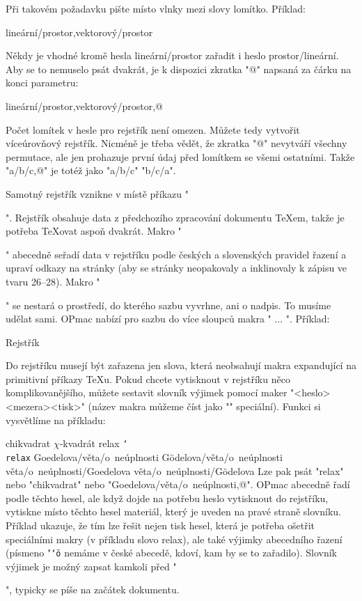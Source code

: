 \noindent Při takovém požadavku pište místo vlnky mezi slovy lomítko. Příklad:

\begtt
\ii lineární/prostor,vektorový/prostor
\endtt

Někdy je vhodné kromě hesla lineární/prostor zařadit i heslo
prostor/lineární. Aby se to nemuselo psát dvakrát, je k dispozici zkratka
"@" napsaná za čárku na konci parametru:

\begtt
\ii lineární/prostor,vektorový/prostor,@
\endtt

Počet lomítek v hesle pro rejstřík není omezen. Můžete tedy vytvořit
víceúrovňový rejstřík. Nicméně je třeba vědět, že zkratka "@" nevytváří
všechny permutace, ale jen prohazuje první údaj před lomítkem se všemi
ostatními. Takže "\ii a/b/c,@" je totéž jako "\ii a/b/c" "\ii b/c/a".

Samotný rejstřík vznikne v místě příkazu "\makeindex". Rejstřík obsahuje
data z předchozího zpracování dokumentu \TeX{}em, takže je potřeba
\TeX{}ovat aspoň dvakrát. Makro "\makeindex" abecedně seřadí data v rejstříku
podle českých a slovenských pravidel řazení a upraví odkazy na stránky
(aby se stránky neopakovaly a inklinovaly k zápisu ve tvaru 26--28). Makro
"\makeindex" se nestará o prostředí, do kterého sazbu vyvrhne, ani o nadpis.
To musíme udělat sami. OPmac nabízí pro sazbu do více sloupců makra
" ... \endmulti". Příklad:

\begtt
\sec Rejstřík\par
{} \makeindex \endmulti
\endtt

Do rejstříku musejí být zařazena jen  slova, která neobsahují makra
expandující na primitivní příkazy \TeX{}u. Pokud chcete vytisknout v rejstříku
něco komplikovanějšího, můžete sestavit slovník výjimek pomocí 
maker "\iis <heslo><mezera>{<tisk>}" 
(název makra můžeme číst jako "\ii" speciální). 
Funkci si vysvětlíme na příkladu:

\begtt
\iis chikvadrat {$\chi$-kvadrát}
\iis relax {{\tt \char`\\relax}}
\iis Goedelova/věta/o~neúplnosti {G\"odelova/věta/o~neúplnosti}
\iis věta/o~neúplnosti/Goedelova {věta/o~neúplnosti/G\"odelova}
\endtt
%
Lze pak psát "\ii relax" nebo "\ii chikvadrat" nebo 
"\ii Goedelova/věta/o~neúplnosti,@". 
OPmac abecedně řadí podle těchto hesel, ale když dojde
na potřebu heslo vytisknout do rejstříku, vytiskne místo těchto hesel
materiál, 
který je uveden na pravé straně slovníku. 
Příklad ukazuje, že tím lze
řešit nejen tisk hesel, která je potřeba ošetřit
speciálními makry (v příkladu slovo relax), ale také
výjimky abecedního řazení (písmeno "\"{\tt\char`\"o} 
nemáme v české abecedě, kdoví, kam by se to zařadilo). 
%
Slovník výjimek je možný zapsat kamkoli před "\makeindex", 
typicky se píše na začátek dokumentu. 

